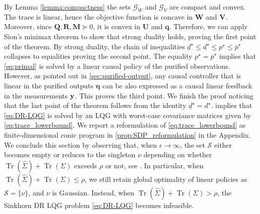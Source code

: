 \documentclass[letterpaper, 10 pt, conference]{ieeeconf}  %
\makeatletter
\renewenvironment{proof}[1][\proofname]{\par
  \pushQED{\qed}%
  \normalfont \topsep\z@
  \trivlist
  \item[\hskip2em
        \itshape
    #1\@addpunct{:}]\ignorespaces
}{%
  \popQED\endtrivlist\@endpefalse
}
\theoremstyle{ieeeconf}
\newtheorem{remark}{Remark}
\DeclareMathOperator{\Tr}{Tr}
\newcommand{\Prob}{\mathbb{P}}
\newcommand{\dd}{\mathop{}\!\mathrm{d}}
\makeatother
\begin{document}
\begin{proof}
By Lemma \ref{lemma:compactness} the sets $\mathcal{G}_W$ and $\mathcal{G}_V$ are compact and convex. The trace is linear, hence the objective function is
concave in $\mathbf{W}$ and $\mathbf{V}$. Moreover, since $\mathbf{Q}, \mathbf{R}, \mathbf{M} \succeq 0$, it is convex in $\mathbf{U}$ and $\mathbf{q}$. Therefore, 
we can apply Sion's minimax theorem \cite[Theorem 3.4]{Sion1958} to show that strong duality holds, proving the first point of the theorem. 
By strong duality, the chain of inequalities $\underline{d}^\star \leq d^\star \leq p^\star \leq \overline{p}^\star$ collapses to equalities proving the second point.
The equality 
$p^\star = \overline{p}^\star$ implies that \eqref{eq:primal} is solved by a linear causal policy of the purified observations. However, as pointed out in \cref{sec:purified-output}, any causal controller that is linear in the purified outputs $\bm\eta$ can be also expressed as a causal linear feedback in the measurements $\bf y$. This proves the third point. We finish the proof noticing that the last point of the theorem follows from the identity $\underline{d}^\star = d^\star$. 
\end{proof}
 implies that \eqref{eq:DR-LQG} is solved by an LQG with worst-case covariance matrices given by \eqref{eq:trace_lowerbound}. We report a reformulation of \eqref{eq:trace_lowerbound} as finite-dimensional conic program in \cref{prop:SDP_reformulation} in the Appendix.
We conclude this section by observing that, when $\epsilon\rightarrow\infty$, the set $\mathcal{S}$ either becomes empty or reduces to the singleton $\nu$ depending on whether $\Tr(\hat{\Sigma}) + \Tr(\Sigma)$ exceeds $\rho$ or not, see \cite[Proposition 1]{cescon2025data}. In particular, when $\Tr(\hat{\Sigma}) + \Tr(\Sigma) \leq \rho$, we still retain global optimality of linear policies as $\mathcal{S} = \{\nu\}$, and $\nu$ is Gaussian. Instead, when $\Tr(\hat{\Sigma}) + \Tr(\Sigma) > \rho$, the Sinkhorn DR LQG problem \eqref{eq:DR-LQG} becomes infeasible.
\end{document}
